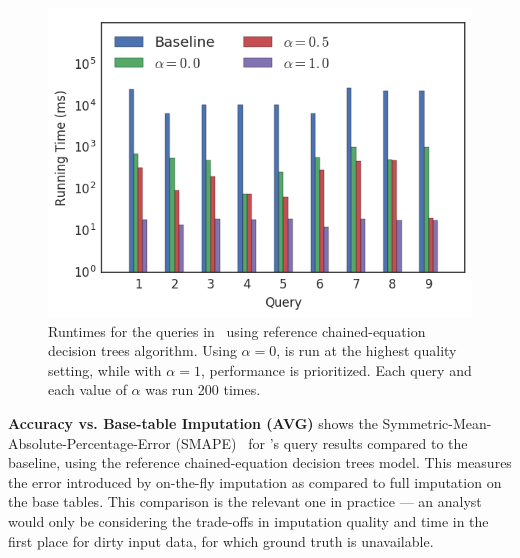 {\begin{figure}
\includegraphics[width=\columnwidth]{figures/running_times_combined_bar.png}
\caption{Runtimes for the queries in~ using reference
    chained-equation decision trees algorithm. Using $\alpha=0$, \ProjectName{}
    is run at the highest quality setting, while with $\alpha=1$, performance
    is prioritized. Each query and each value of $\alpha$ was run 200 times.}
\label{fig:runtimes}
\end{figure}




\textbf{Accuracy vs. Base-table Imputation (AVG)}\quad {} shows the Symmetric-Mean-Absolute-Percentage-Error (SMAPE)~\cite{Makridakis2000451} for \ProjectName{}'s query results compared to the baseline, using the reference chained-equation decision trees model.
This measures the error introduced by on-the-fly imputation as compared to full imputation on the base tables.
This comparison is the relevant one in practice --- an analyst would only be considering the trade-offs in imputation quality and time in the first place for dirty input data, for which ground truth is unavailable.

}
